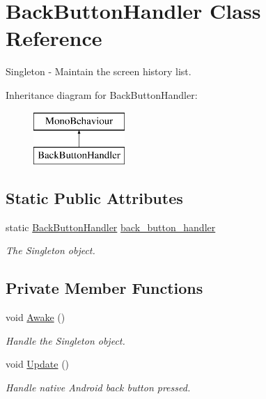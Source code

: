 \hypertarget{class_back_button_handler}{}\section{Back\+Button\+Handler Class Reference}
\label{class_back_button_handler}


Singleton -\/ Maintain the screen history list.  


Inheritance diagram for Back\+Button\+Handler\+:\begin{figure}[H]
\begin{center}
\leavevmode
\includegraphics[height=2.000000cm]{class_back_button_handler}
\end{center}
\end{figure}
\subsection*{Static Public Attributes}
\begin{DoxyCompactItemize}
\item 
static \mbox{\hyperlink{class_back_button_handler}{Back\+Button\+Handler}} \mbox{\hyperlink{class_back_button_handler_a6fd6f32fc652c5be872ebdeef591ecfe}{back\+\_\+button\+\_\+handler}}
\begin{DoxyCompactList}\small\item\em The Singleton object. \end{DoxyCompactList}\end{DoxyCompactItemize}
\subsection*{Private Member Functions}
\begin{DoxyCompactItemize}
\item 
void \mbox{\hyperlink{class_back_button_handler_ac35dc3235b4f8a0b86645237b2490ace}{Awake}} ()
\begin{DoxyCompactList}\small\item\em Handle the Singleton object. \end{DoxyCompactList}\item 
void \mbox{\hyperlink{class_back_button_handler_a35b84c30f2f379a6722cef7d347eaf80}{Update}} ()
\begin{DoxyCompactList}\small\item\em Handle native Android back button pressed. \end{DoxyCompactList}\end{DoxyCompactItemize}


